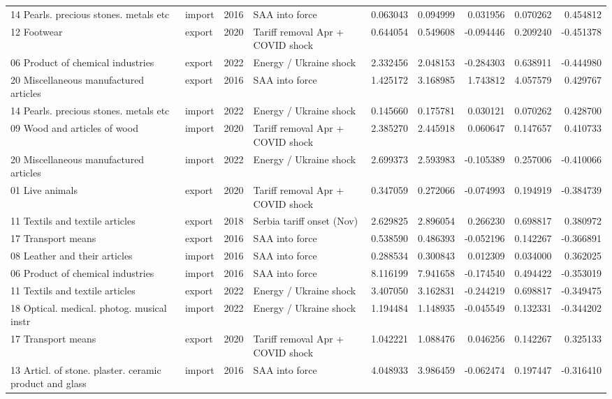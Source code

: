\begin{tabular}{llrlrrrrr}
14 Pearls. precious stones. metals etc & import & 2016 & SAA into force & 0.063043 & 0.094999 & 0.031956 & 0.070262 & 0.454812 \\
12 Footwear & export & 2020 & Tariff removal Apr + COVID shock & 0.644054 & 0.549608 & -0.094446 & 0.209240 & -0.451378 \\
06 Product of chemical industries & export & 2022 & Energy / Ukraine shock & 2.332456 & 2.048153 & -0.284303 & 0.638911 & -0.444980 \\
20 Miscellaneous manufactured articles & export & 2016 & SAA into force & 1.425172 & 3.168985 & 1.743812 & 4.057579 & 0.429767 \\
14 Pearls. precious stones. metals etc & import & 2022 & Energy / Ukraine shock & 0.145660 & 0.175781 & 0.030121 & 0.070262 & 0.428700 \\
09 Wood and articles of wood & import & 2020 & Tariff removal Apr + COVID shock & 2.385270 & 2.445918 & 0.060647 & 0.147657 & 0.410733 \\
20 Miscellaneous manufactured articles & import & 2022 & Energy / Ukraine shock & 2.699373 & 2.593983 & -0.105389 & 0.257006 & -0.410066 \\
01 Live animals & export & 2020 & Tariff removal Apr + COVID shock & 0.347059 & 0.272066 & -0.074993 & 0.194919 & -0.384739 \\
11 Textils and textile articles & export & 2018 & Serbia tariff onset (Nov) & 2.629825 & 2.896054 & 0.266230 & 0.698817 & 0.380972 \\
17 Transport means & export & 2016 & SAA into force & 0.538590 & 0.486393 & -0.052196 & 0.142267 & -0.366891 \\
08 Leather and their articles & import & 2016 & SAA into force & 0.288534 & 0.300843 & 0.012309 & 0.034000 & 0.362025 \\
06 Product of chemical industries & import & 2016 & SAA into force & 8.116199 & 7.941658 & -0.174540 & 0.494422 & -0.353019 \\
11 Textils and textile articles & export & 2022 & Energy / Ukraine shock & 3.407050 & 3.162831 & -0.244219 & 0.698817 & -0.349475 \\
18 Optical. medical. photog. musical instr & import & 2022 & Energy / Ukraine shock & 1.194484 & 1.148935 & -0.045549 & 0.132331 & -0.344202 \\
17 Transport means & export & 2020 & Tariff removal Apr + COVID shock & 1.042221 & 1.088476 & 0.046256 & 0.142267 & 0.325133 \\
13 Articl. of stone. plaster. ceramic product and glass & import & 2016 & SAA into force & 4.048933 & 3.986459 & -0.062474 & 0.197447 & -0.316410 \\

\end{tabular}
